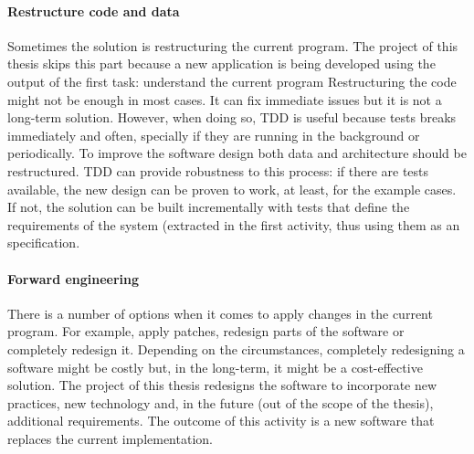 \paragraph{Restructure code and data}
Sometimes the solution is restructuring the current program.
The project of this thesis skips this part because a new application is being developed using the output of the first task: understand the current program
Restructuring the code might not be enough in most cases. 
It can fix immediate issues but it is not a long-term solution.
However, when doing so, \ac{TDD} is useful because tests breaks immediately and often, specially if they are running in the background or periodically.
To improve the software design both data and architecture should be restructured.
\ac{TDD} can provide robustness to this process: if there are tests available, the new design can be proven to work, at least, for the example cases. 
If not, the solution can be built incrementally with tests that define the requirements of the system (extracted in the first activity, thus using them as an specification.

\paragraph{Forward engineering}
There is a number of options when it comes to apply changes in the current program. 
For example, apply patches, redesign parts of the software or completely redesign it.
Depending on the circumstances, completely redesigning a software might be costly but, in the long-term, it might be a cost-effective solution.
The project of this thesis redesigns the software to incorporate new practices, new technology and, in the future (out of the scope of the thesis), additional requirements.
The outcome of this activity is a new software that replaces the current implementation.




